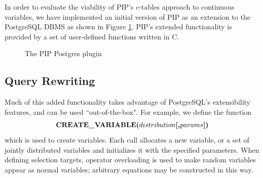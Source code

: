 In order to evaluate the viability of PIP's c-tables approach to continuous variables, we have implemented an initial version of PIP as an extension to the PostgreSQL DBMS as shown in Figure \ref{fig:blockdiag}.  PIP's extended functionality is provided by a set of user-defined functions written in C.  

\begin{figure}
\begin{center}
\caption{The PIP Postgres plugin}
\label{fig:blockdiag}
\end{center}
\end{figure}

\subsection{Query Rewriting}
Much of this added functionality takes advantage of PostgreSQL's extensibility features, and can be used ``out-of-the-box".  For example, we define the function 
\[
\mbox{\textbf{CREATE\_VARIABLE($distribution$[,$params$])}}
\]
which is used to create variables.  Each call allocates a new variable, or a set of jointly distributed variables and initializes it with the specified parameters.  When defining selection targets, operator overloading is used to make random variables appear as normal variables; arbitrary equations may be constructed in this way.  


